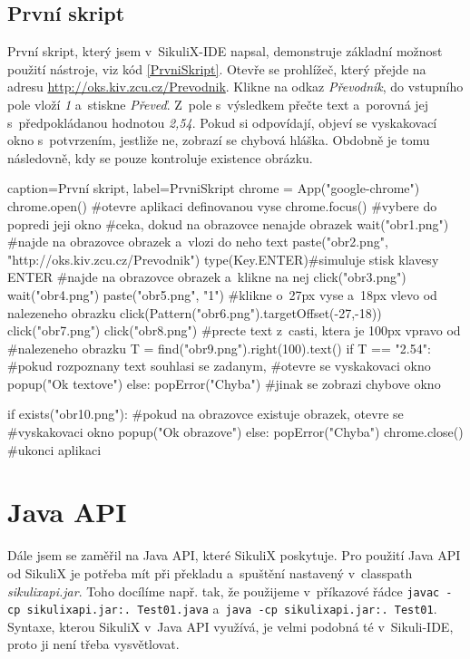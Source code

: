 \documentclass{bakalarka}
\begin{document}
		\subsection{První skript}
		První skript, který jsem v~SikuliX-IDE napsal, demonstruje základní možnost použití nástroje, viz kód \ref{PrvniSkript}. Otevře se prohlížeč, který přejde na adresu \url{http://oks.kiv.zcu.cz/Prevodnik}. Klikne na odkaz \emph{Převodník}, do vstupního pole vloží \emph{1} a~stiskne \emph{Převeď}. Z~pole s~výsledkem přečte text a~porovná jej s~předpokládanou hodnotou \emph{2,54}. Pokud si odpovídají, objeví se vyskakovací okno s~potvrzením, jestliže ne, zobrazí se chybová hláška. Obdobně je tomu následovně, kdy se pouze kontroluje existence obrázku.
		\begin{lstpython}{caption={První skript}, label={PrvniSkript}}
chrome = App("google-chrome")
chrome.open()	#otevre aplikaci definovanou vyse
chrome.focus()	#vybere do popredi jeji okno
#ceka, dokud na obrazovce nenajde obrazek
wait("obr1.png")
#najde na obrazovce obrazek a~vlozi do neho text
paste("obr2.png", "http://oks.kiv.zcu.cz/Prevodnik")
type(Key.ENTER)#simuluje stisk klavesy ENTER
#najde na obrazovce obrazek a~klikne na nej
click("obr3.png")
wait("obr4.png")
paste("obr5.png", "1")
#klikne o~27px vyse a~18px vlevo od nalezeneho obrazku
click(Pattern("obr6.png").targetOffset(-27,-18))
click("obr7.png")
click("obr8.png")
#precte text z~casti, ktera je 100px vpravo od
#nalezeneho obrazku
T = find("obr9.png").right(100).text()
if T == "2.54":
	#pokud rozpoznany text souhlasi se zadanym,
	#otevre se vyskakovaci okno
    popup("Ok textove")
else:
    popError("Chyba")    #jinak se zobrazi chybove okno

if exists("obr10.png"):
	#pokud na obrazovce existuje obrazek, otevre se
	#vyskakovaci okno
    popup("Ok obrazove")
else:
    popError("Chyba")
chrome.close()    #ukonci aplikaci
		\end{lstpython}
		
	\section{Java API}
	Dále jsem se zaměřil na Java API, které SikuliX poskytuje. Pro použití Java API od SikuliX je potřeba mít při překladu a~spuštění nastavený v~classpath \emph{sikulixapi.jar}. Toho docílíme např. tak, že použijeme v~příkazové řádce \texttt{javac -cp sikulixapi.jar:. Test01.java} a~\texttt{java -cp sikulixapi.jar:. Test01}. Syntaxe, kterou SikuliX v~Java API využívá, je velmi podobná té v~Sikuli-IDE, proto ji není třeba vysvětlovat.
	
\end{document}
